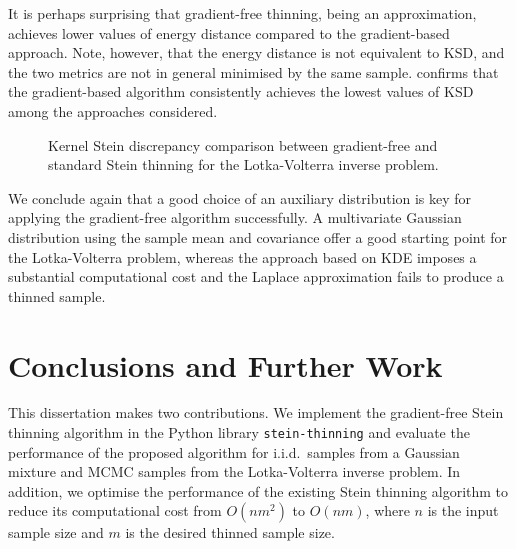 \documentclass[11pt,a4paper]{report}
\begin{document}
It is perhaps surprising that gradient-free thinning, being an approximation, achieves lower values of energy distance compared to the gradient-based approach. Note, however, that the energy distance is not equivalent to KSD, and the two metrics are not in general minimised by the same sample.  confirms that the gradient-based algorithm consistently achieves the lowest values of KSD among the approaches considered.

\begin{figure}[h]
\centering
{}
\caption{Kernel Stein discrepancy comparison between gradient-free and standard Stein thinning for the Lotka-Volterra inverse problem.
\label{fig:lotka-volterra:gf-thinning:ksd}}
\end{figure}

We conclude again that a good choice of an auxiliary distribution is key for applying the gradient-free algorithm successfully. A multivariate Gaussian distribution using the sample mean and covariance offer a good starting point for the Lotka-Volterra problem, whereas the approach based on KDE imposes a substantial computational cost and the Laplace approximation fails to produce a thinned sample.

\chapter{Conclusions and Further Work}
\label{ch:conclusions}

This dissertation makes two contributions. We implement the gradient-free Stein thinning algorithm in the Python library \texttt{stein-thinning} and evaluate the performance of the proposed algorithm for i.i.d.\ samples from a Gaussian mixture and MCMC samples from the Lotka-Volterra inverse problem. In addition, we optimise the performance of the existing Stein thinning algorithm to reduce its computational cost from $O(nm^2)$ to $O(nm)$, where $n$ is the input sample size and $m$ is the desired thinned sample size.
\end{document}
